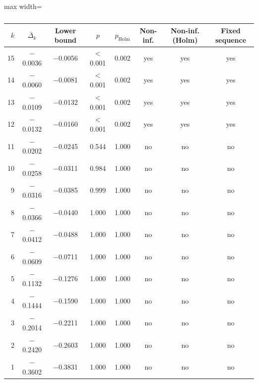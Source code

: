 \begin{table}[t]
\centering
\small
\caption{}
\label{tab:h1_holm}
\setlength{\tabcolsep}{4pt}
\begin{adjustbox}{max width=\textwidth}
\begin{tabular}{rccccccc}
\toprule
$k$ & $\bar\Delta_k$ & Lower bound & $p$ & $p_{\mathrm{Holm}}$ & Non-inf. & Non-inf. (Holm) & Fixed sequence \\
\midrule
15 & $-$0.0036 & $-$0.0056 & $<$0.001 & 0.002 & yes & yes & yes \\
14 & $-$0.0060 & $-$0.0081 & $<$0.001 & 0.002 & yes & yes & yes \\
13 & $-$0.0109 & $-$0.0132 & $<$0.001 & 0.002 & yes & yes & yes \\
12 & $-$0.0132 & $-$0.0160 & $<$0.001 & 0.002 & yes & yes & yes \\
11 & $-$0.0202 & $-$0.0245 & 0.544 & 1.000 & no & no & no \\
10 & $-$0.0258 & $-$0.0311 & 0.984 & 1.000 & no & no & no \\
9 & $-$0.0316 & $-$0.0385 & 0.999 & 1.000 & no & no & no \\
8 & $-$0.0366 & $-$0.0440 & 1.000 & 1.000 & no & no & no \\
7 & $-$0.0412 & $-$0.0488 & 1.000 & 1.000 & no & no & no \\
6 & $-$0.0609 & $-$0.0711 & 1.000 & 1.000 & no & no & no \\
5 & $-$0.1132 & $-$0.1276 & 1.000 & 1.000 & no & no & no \\
4 & $-$0.1444 & $-$0.1590 & 1.000 & 1.000 & no & no & no \\
3 & $-$0.2014 & $-$0.2211 & 1.000 & 1.000 & no & no & no \\
2 & $-$0.2420 & $-$0.2603 & 1.000 & 1.000 & no & no & no \\
1 & $-$0.3602 & $-$0.3831 & 1.000 & 1.000 & no & no & no \\
\bottomrule
\end{tabular}
\end{adjustbox}
\par\smallskip\parbox{0.95\linewidth}{\footnotesize {}}
\end{table}

